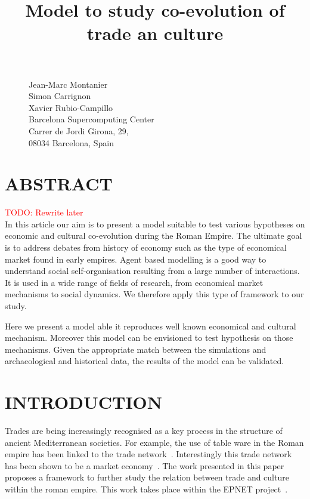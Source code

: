 \documentclass{wscpaperproc}
\newcommand{\memo}[2]{\textcolor{#1}{#2}}
\newcommand{\todo}[1]{\memo{red}{TODO: #1\\}}
\begin{document}

\title{Model to study co-evolution of trade an culture}
\maketitle

\begin{figure}[htb]
{
\centering
Jean-Marc Montanier\\
Simon Carrignon\\ 
Xavier Rubio-Campillo\\
\vspace{12pt}
Barcelona Supercomputing Center\\
Carrer de Jordi Girona, 29, \\
08034 Barcelona, Spain\\
}
\end{figure}







\section*{ABSTRACT}

\todo{Rewrite later}
In this article our aim is to present a model suitable to test various hypotheses on economic and cultural co-evolution during the Roman Empire. The ultimate goal is to address debates from history of economy such as the type of economical market found in early empires. Agent based modelling is a good way to understand social self-organisation resulting from a large number of interactions. It is used in a wide range of fields of research, from economical market mechanisms to social dynamics. We therefore apply this type of framework to our study.

Here we present a model able it reproduces well known economical and cultural mechanism. Moreover this model can be envisioned to test hypothesis on those mechanisms. Given the appropriate match between the simulations and archaeological and historical data, the results of the model can be validated.


\section{INTRODUCTION}\label{sec:intro}

Trades are being increasingly recognised as a key process in the structure of ancient Mediterranean societies. For example, the use of table ware in the Roman empire  has been linked to the trade network~\cite{brughmans_connecting_2010}. Interestingly this trade network has been shown to be a market economy~\cite{temin_market_2001}. The work presented in this paper proposes a framework to further study the relation between trade and culture within the roman empire. This work takes place within the EPNET project~\cite{remesal_epnet_2014}.
\end{document}
